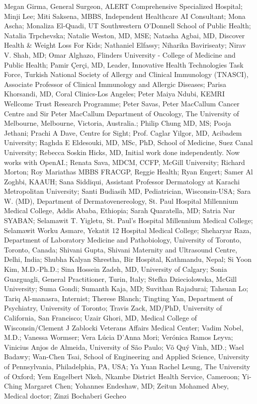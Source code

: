 Megan Girma, General Surgeon, ALERT Comprehensive Specialized Hospital; Minji Lee; Miti Saksena, MBBS, Independent Healthcare AI Consultant; Mona Ascha; Monaliza El-Quadi, UT Southwestern O’Donnell School of Public Health; Natalia Trpchevska; Natalie Weston, MD, MSE; Natasha Agbai, MD, Discover Health \& Weight Loss For Kids; Nathaniel Elfassy; Niharika Baviriseaty; Nirav V. Shah, MD; Omar Alghazo, Flinders University - College of Medicine and Public Health; Pamir Çerçi, MD, Leader, Innovative Health Technologies Task Force, Turkish National Society of Allergy and Clinical Immunology (TNASCI), Associate Professor of Clinical Immunology and Allergic Diseases; Parisa Khorsandi, MD, Coral Clinics-Los Angeles; Peter Maiya Ndubi, KEMRI Wellcome Trust Research Programme; Peter Savas, Peter MacCallum Cancer Centre and Sir Peter MacCallum Department of Oncology, The University of Melbourne, Melbourne, Victoria, Australia.; Philip Chung MD, MS; Pooja Jethani; Prachi A Dave, Centre for Sight; Prof. Caglar Yilgor, MD, Acibadem University; Raghda E Eldesouki, MD, MSc, PhD, School of Medicine, Suez Canal University; Rebecca Soskin Hicks, MD, Initial work done independently. Now works with OpenAI.; Renata Sava, MDCM, CCFP, McGill University; Richard Morton; Roy Mariathas MBBS FRACGP, Reggie Health; Ryan Engert; Samer Al Zoghbi, KAAUH; Sana Siddiqui, Assistant Professor Dermatology at Karachi Metropolitan University; Santi Budiasih MD, Pediatrician, Wisconsin-USA; Sara W. (MD), Department of Dermatovenereology, St. Paul Hospital Millennium Medical College, Addis Ababa, Ethiopia; Sarah Quaratella, MD; Satria Nur SYABAN; Selamawit T. Yigletu, St. Paul's Hospital Millennium Medical College; Selamawit Worku Asmare, Yekatit 12 Hospital Medical College; Sheharyar Raza, Department of Laboratory Medicine and Pathobiology, University of Toronto, Toronto, Canada; Shivani Gupta, Shivani Maternity and Ultrasound Centre, Delhi, India; Shubha Kalyan Shrestha, Bir Hospital, Kathmandu, Nepal; Si Yoon Kim, M.D.-Ph.D.; Sina Hossein Zadeh, MD, University of Calgary; Sonia Guarguagli, General Practitioner, Turin, Italy; Stefka Dzieciolowska, McGill University; Suma Gondi; Sumanth Kaja, MD; Suvithan Rajadurai; Tahsuan Lo; Tariq Al-manasra, Internist; Therese Blanch; Tingting Yan, Department of Psychiatry, University of Toronto; Travis Zack, MD/PhD, University of California, San Francisco; Uzair Ghori, MD, Medical College of Wisconsin/Clement J Zablocki Veterans Affairs Medical Center; Vadim Nobel, M.D.; Vanessa Wormser; Vera Lúcia D'Anna Mori; Verónica Ramos Leyva; Vinicius Anjos de Almeida, University of São Paulo; Võ Quý Vinh, MD.; Wael Badawy; Wan-Chen Tsai, School of Engineering and Applied Science, University of Pennsylvania, Philadelphia, PA, USA; Ya Yuan Rachel Leung, The University of Oxford; Yem Engelbert Nkeh, Nkambe District Health Service, Cameroon; Yi-Ching Margaret Chen; Yohannes Endeshaw, MD; Zeitun Mohamed Abey, Medical doctor; Zinzi Bochaberi Gecheo
